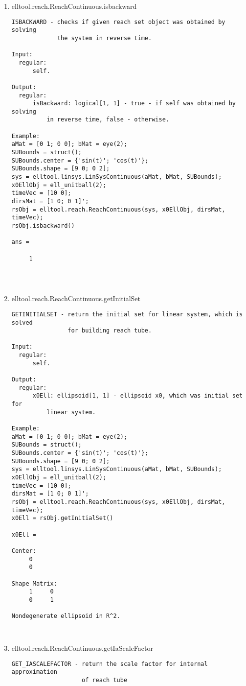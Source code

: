 \begin{enumerate}
\begin{lstlisting}
\end{lstlisting}
\fontfamily{\familydefault}
\selectfont
\item {elltool.reach.ReachContinuous.isbackward}
\selectfont
\begin{lstlisting}
ISBACKWARD - checks if given reach set object was obtained by solving
             the system in reverse time.

Input:
  regular:
      self.

Output:
  regular:
      isBackward: logical[1, 1] - true - if self was obtained by solving
          in reverse time, false - otherwise.

Example:
aMat = [0 1; 0 0]; bMat = eye(2);
SUBounds = struct();
SUBounds.center = {'sin(t)'; 'cos(t)'};
SUBounds.shape = [9 0; 0 2];
sys = elltool.linsys.LinSysContinuous(aMat, bMat, SUBounds);
x0EllObj = ell_unitball(2);
timeVec = [10 0];
dirsMat = [1 0; 0 1]';
rsObj = elltool.reach.ReachContinuous(sys, x0EllObj, dirsMat, timeVec);
rsObj.isbackward()

ans =

     1




\end{lstlisting}
\fontfamily{\familydefault}
\selectfont
\item {elltool.reach.ReachContinuous.getInitialSet}
\selectfont
\begin{lstlisting}
GETINITIALSET - return the initial set for linear system, which is solved
                for building reach tube.

Input:
  regular:
      self.

Output:
  regular:
      x0Ell: ellipsoid[1, 1] - ellipsoid x0, which was initial set for
          linear system.

Example:
aMat = [0 1; 0 0]; bMat = eye(2);
SUBounds = struct();
SUBounds.center = {'sin(t)'; 'cos(t)'};
SUBounds.shape = [9 0; 0 2];
sys = elltool.linsys.LinSysContinuous(aMat, bMat, SUBounds);
x0EllObj = ell_unitball(2);
timeVec = [10 0];
dirsMat = [1 0; 0 1]';
rsObj = elltool.reach.ReachContinuous(sys, x0EllObj, dirsMat, timeVec);
x0Ell = rsObj.getInitialSet()

x0Ell =

Center:
     0
     0

Shape Matrix:
     1     0
     0     1

Nondegenerate ellipsoid in R^2.



\end{lstlisting}
\fontfamily{\familydefault}
\selectfont
\item {elltool.reach.ReachContinuous.getIaScaleFactor}
\selectfont
\begin{lstlisting}
GET_IASCALEFACTOR - return the scale factor for internal approximation
                    of reach tube


\end{lstlisting}
\end{enumerate}
